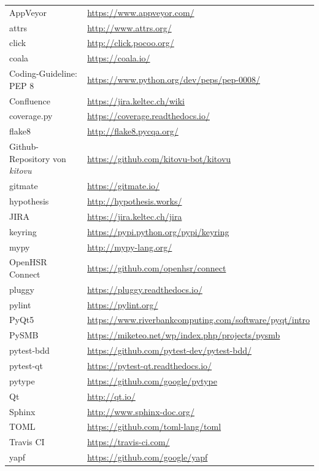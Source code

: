 \documentclass[a4paper]{article}
\def\jiraurl{https://jira.keltec.ch/jira}
\def\confluenceurl{https://jira.keltec.ch/wiki}
\begin{document}
\begin{tabulary}{\linewidth}{ll}
  AppVeyor & \url{https://www.appveyor.com/} \\
  attrs & \url{http://www.attrs.org/} \\ 
  click & \url{http://click.pocoo.org/} \\ 
  coala & \url{https://coala.io/} \\
  Coding-Guideline: PEP 8 & \url{https://www.python.org/dev/peps/pep-0008/} \\
  Confluence & \url{\confluenceurl} \\
  coverage.py & \url{https://coverage.readthedocs.io/} \\
  flake8 & \url{http://flake8.pycqa.org/} \\
  Github-Repository von \emph{kitovu} & \url{https://github.com/kitovu-bot/kitovu} \\
  gitmate & \url{https://gitmate.io/} \\
  hypothesis & \url{http://hypothesis.works/} \\
  JIRA	& \url{\jiraurl} \\
  keyring & \url{https://pypi.python.org/pypi/keyring} \\ 
  mypy & \url{http://mypy-lang.org/} \\
  OpenHSR Connect & \url{https://github.com/openhsr/connect} \\
  pluggy & \url{https://pluggy.readthedocs.io/} \\ 
  pylint & \url{https://pylint.org/} \\
  PyQt5 & \url{https://www.riverbankcomputing.com/software/pyqt/intro} \\ 
  PySMB & \url{https://miketeo.net/wp/index.php/projects/pysmb} \\ 
  pytest-bdd & \url{https://github.com/pytest-dev/pytest-bdd/} \\
  pytest-qt & \url{https://pytest-qt.readthedocs.io/} \\
  pytype & \url{https://github.com/google/pytype} \\ 
  Qt & \url{http://qt.io/} \\ 
  Sphinx & \url{http://www.sphinx-doc.org/} \\
  TOML & \url{https://github.com/toml-lang/toml} \\ 
  Travis CI & \url{https://travis-ci.com/} \\
  yapf & \url{https://github.com/google/yapf} \\
\end{tabulary}
\end{document}
